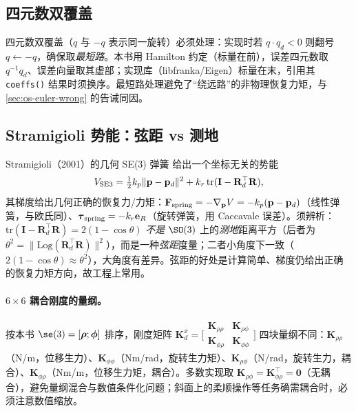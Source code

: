 \subsection{四元数双覆盖}
\label{sec:os-quaternion}

四元数双覆盖（$q$ 与 $-q$ 表示同一旋转）必须处理：实现时若 $q\cdot q_d<0$ 则翻号 $q\leftarrow-q$，确保取\emph{最短路}。本书用 Hamilton 约定（标量在前），误差四元数取 $q^{-1}q_d$、误差向量取其虚部；实现库（libfranka/Eigen）标量在末，引用其 \texttt{coeffs()} 结果时须换序。最短路处理避免了“绕远路”的非物理恢复力矩，与 \cref{sec:os-euler-wrong} 的告诫同因。

\subsection{Stramigioli 势能：弦距 vs 测地}
\label{sec:os-stramigioli}

Stramigioli（2001）的几何 SE(3) 弹簧\cite{stramigioli2001modeling} 给出一个坐标无关的势能
\begin{equation}
  V_{\rm SE3}=\tfrac12 k_p\|\mathbf p-\mathbf p_d\|^2+k_r\,\mathrm{tr}(\mathbf I-\mathbf R_d^\top\mathbf R),
  \label{eq:os-se3-potential}
\end{equation}
其梯度给出几何正确的恢复力/力矩：$\mathbf F_{\rm spring}=-\nabla_{\mathbf p}V=-k_p(\mathbf p-\mathbf p_d)$（线性弹簧，与欧氏同）、$\boldsymbol\tau_{\rm spring}=-k_r\mathbf e_R$（旋转弹簧，用 Caccavale 误差）。须辨析：$\mathrm{tr}(\mathbf I-\mathbf R_d^\top\mathbf R)=2(1-\cos\theta)$ \emph{不是} $\SO(3)$ 上的\emph{测地}距离平方（后者为 $\theta^2=\|\mathrm{Log}(\mathbf R_d^\top\mathbf R)\|^2$），而是一种\emph{弦距}度量；二者小角度下一致（$2(1-\cos\theta)\approx\theta^2$），大角度有差异。弦距的好处是计算简单、梯度仍给出正确的恢复力矩方向，故工程上常用。

\paragraph{$6\times6$ 耦合刚度的量纲。}
按本书 $\se(3)=[\boldsymbol\rho;\boldsymbol\phi]$ 排序，刚度矩阵 $\mathbf K_d^x=\bigl[\begin{smallmatrix}\mathbf K_{\rho\rho}&\mathbf K_{\rho\phi}\\\mathbf K_{\phi\rho}&\mathbf K_{\phi\phi}\end{smallmatrix}\bigr]$ 四块量纲不同：$\mathbf K_{\rho\rho}$（N/m，位移生力）、$\mathbf K_{\phi\phi}$（Nm/rad，旋转生力矩）、$\mathbf K_{\rho\phi}$（N/rad，旋转生力，耦合）、$\mathbf K_{\phi\rho}$（Nm/m，位移生力矩，耦合）。多数实现取 $\mathbf K_{\rho\phi}=\mathbf K_{\phi\rho}^\top=\mathbf 0$（无耦合），避免量纲混合与数值条件化问题；斜面上的柔顺操作等任务确需耦合时，必须注意数值缩放。


